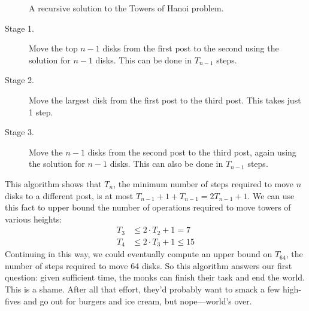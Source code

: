 \begin{figure}

\caption{A recursive solution to the Towers of Hanoi problem.}

\label{fig:10A3}

\end{figure}

\begin{description}

\item[Stage 1.]  Move the top $n-1$ disks from the first post to
  the second using the solution for $n - 1$ disks.  This can be done
  in $T_{n-1}$ steps.

\item[Stage 2.]  Move the largest disk from the first post to the
  third post.  This takes just 1 step.

\item[Stage 3.]  Move the $n-1$ disks from the second post to
  the third post, again using the solution for $n - 1$ disks.  This
  can also be done in $T_{n-1}$ steps.

\end{description}

This algorithm shows that $T_n$, the minimum number of steps required
to move $n$ disks to a different post, is at most $T_{n-1} + 1 +
T_{n-1} = 2 T_{n-1} + 1$.  We can use this fact to upper bound the
number of operations required to move towers of various heights:
\begin{align*}
T_3 & \leq 2 \cdot T_2 + 1 = 7 \\
T_4 & \leq 2 \cdot T_3 + 1 \leq 15
\end{align*}
Continuing in this way, we could eventually compute an upper bound on
$T_{64}$, the number of steps required to move 64 disks.  So this
algorithm answers our first question: given sufficient time, the monks
can finish their task and end the world.  This is a shame.  After all
that effort, they'd probably want to smack a few high-fives and go out
for burgers and ice cream, but nope---world's over.

